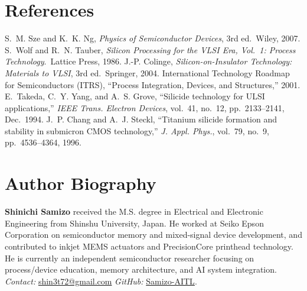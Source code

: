 \documentclass[conference]{IEEEtran}
\begin{document}
\section*{References}
\begin{thebibliography}{99}
S.~M. Sze and K.~K. Ng, \emph{Physics of Semiconductor Devices}, 3rd ed.\ Wiley, 2007.
S.~Wolf and R.~N. Tauber, \emph{Silicon Processing for the VLSI Era, Vol.~1: Process Technology}.\ Lattice Press, 1986.
J.-P. Colinge, \emph{Silicon-on-Insulator Technology: Materials to VLSI}, 3rd ed.\ Springer, 2004.
International Technology Roadmap for Semiconductors (ITRS), ``Process Integration, Devices, and Structures,'' 2001.
E.~Takeda, C.~Y. Yang, and A.~S. Grove, ``Silicide technology for ULSI applications,'' \emph{IEEE Trans. Electron Devices}, vol.~41, no.~12, pp.~2133--2141, Dec.~1994.
J.~P. Chang and A.~J. Steckl, ``Titanium silicide formation and stability in submicron CMOS technology,'' \emph{J. Appl. Phys.}, vol.~79, no.~9, pp.~4536--4364, 1996.
\end{thebibliography}

\section*{Author Biography}
\textbf{Shinichi Samizo} received the M.S. degree in Electrical and Electronic Engineering from Shinshu University, Japan.
He worked at Seiko Epson Corporation on semiconductor memory and mixed-signal device development, and contributed to inkjet MEMS actuators and PrecisionCore printhead technology.
He is currently an independent semiconductor researcher focusing on process/device education, memory architecture, and AI system integration.\\
\emph{Contact:} \href{mailto:shin3t72@gmail.com}{shin3t72@gmail.com}\quad
\emph{GitHub:} \href{https://github.com/Samizo-AITL}{Samizo-AITL}.
\end{document}
